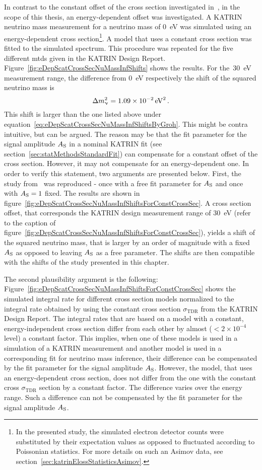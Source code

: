 In contrast to the constant offset of the cross section investigated in~\cite{Groh2015}, in the scope of this thesis, an energy-dependent offset was investigated. A KATRIN neutrino mass measurement for a neutrino mass of \SI{0}{eV} was simulated using an energy-dependent cross section\footnote{In the presented study, the simulated electron detector counts were substituted by their expectation values as opposed to fluctuated according to Poissonian statistics. For more details on such an Asimov data, see section~\ref{sec:katrinElossStatisticsAsimov}.}. A model that uses a constant cross section was fitted to the simulated spectrum. This procedure was repeated for the five different \gls{mtd}s given in the KATRIN Design Report. Figure~\ref{fig:eDepScatCrossSecNuMassInfShifts} shows the results. For the~\SI{30}{eV} measurement range, the difference from \SI{0}{eV} respectively the shift of the squared neutrino mass is
\begin{equation}
	\Delta m_\upnu^2 = \SI{1.09e-2}{eV^2}
	\text{\,.}
\end{equation}
This shift is larger than the one listed above under equation~\eqref{eq:eDepScatCrossSecNuMassInfShiftsByGroh}. This might be contra intuitive, but can be argued. The reason may be that the fit parameter for the signal amplitude $A_{\mathrm{S}}$ in a nominal KATRIN fit (see section~\ref{sec:statMethodsStandardFit}) can compensate for a constant offset of the cross section. However, it may not compensate for an energy-dependent one. In order to verify this statement, two arguments are presented below.
First, the study from~\cite{Groh2015} was reproduced - once with a free fit parameter for $A_{\mathrm{S}}$ and once with $A_{\mathrm{S}}=1$ fixed. The results are shown in figure~\ref{fig:eDepScatCrossSecNuMassInfShiftsForConstCrossSec}. A cross section offset, that corresponds the KATRIN design measurement range of \SI{30}{eV} (refer to the caption of figure~\ref{fig:eDepScatCrossSecNuMassInfShiftsForConstCrossSec}), yields a shift of the squared neutrino mass, that is larger by an order of magnitude with a fixed $A_{\mathrm{S}}$ as opposed to leaving $A_{\mathrm{S}}$ as a free parameter. The shifts are then compatible with the shifts of the study presented in this chapter.

The second plausibility argument is the following: Figure~\ref{fig:eDepScatCrossSecNuMassInfShiftsForConstCrossSec} shows the simulated integral rate for different cross section models normalized to the integral rate obtained by using the constant cross section $\sigma_\mathrm{TDR}$ from the KATRIN Design Report. The integral rates that are based on a model with a constant, energy-independent cross section differ from each other by almost ($<2\times10^{-4}$ level) a constant factor. This implies, when one of these models is used in a simulation of a KATRIN measurement and another model is used in a corresponding fit for neutrino mass inference, their difference can be compensated by the fit parameter for the signal amplitude $A_{\mathrm{S}}$. However, the model, that uses an energy-dependent cross section, does not differ from the one with the constant cross $\sigma_\mathrm{TDR}$ section by a constant factor. The difference varies over the energy range. Such a difference can not be compensated by the fit parameter for the signal amplitude $A_{\mathrm{S}}$.

